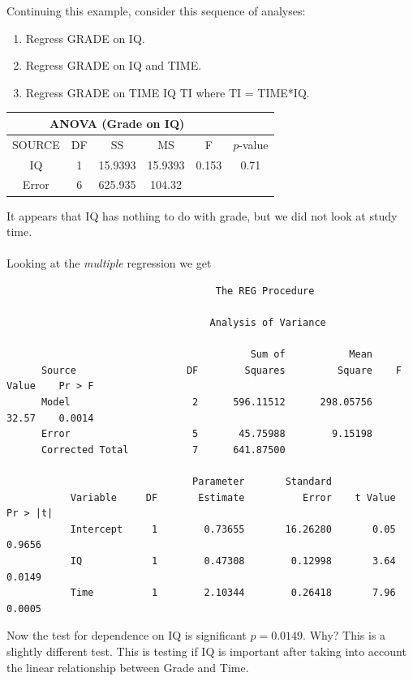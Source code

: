 \documentclass{report}
\begin{document}
\newpage

Continuing this example, consider this sequence of analyses: 
\begin{enumerate}
\item Regress GRADE on IQ. 
\item Regress GRADE on IQ and TIME. 
\item Regress GRADE on TIME IQ TI where TI = TIME*IQ. 
\end{enumerate}

\begin{center}
\begin{tabular}{|c|c|c|c|c|c|}
\multicolumn{5}{c}{ANOVA (Grade on IQ)} \\ \hline
SOURCE   & DF   & SS   & MS   & F & $p$-value\\ \hline
IQ   & 1   & 15.9393   & 15.9393   & 0.153 & 0.71\\
Error   & 6   & 625.935  & 104.32  & & \\  \hline
\end{tabular}
\end{center}

\noindent
It appears that IQ has nothing to do with grade, but we did not look at study time. \\~\\
Looking at the {\itshape multiple} regression we get \\

\begin{small}
\begin{verbatim}
                                    The REG Procedure

                                   Analysis of Variance
 
                                          Sum of           Mean
      Source                   DF        Squares         Square    F Value    Pr > F
      Model                     2      596.11512      298.05756      32.57    0.0014
      Error                     5       45.75988        9.15198                     
      Corrected Total           7      641.87500                                    

                                Parameter       Standard
           Variable     DF       Estimate          Error    t Value    Pr > |t|
           Intercept     1        0.73655       16.26280       0.05      0.9656
           IQ            1        0.47308        0.12998       3.64      0.0149
           Time          1        2.10344        0.26418       7.96      0.0005
\end{verbatim}
\end{small}
Now the test for dependence on IQ is significant $p=0.0149$.  Why?  This is a slightly different test.  This is testing if IQ is important after taking into account the linear relationship between Grade and Time.\\~\\
\end{document}
